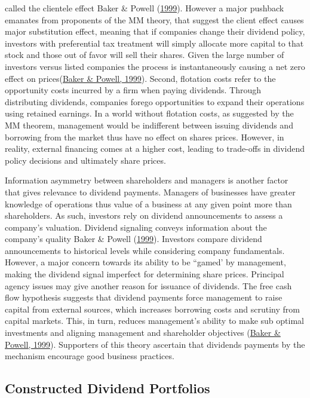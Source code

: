 \documentclass[10pt,preprint, authoryear]{elsarticle}
\numberwithin{equation}{section}
\numberwithin{figure}{section}
\numberwithin{table}{section}
\begin{document}
called the clientele effect Baker \& Powell
(\protect\hyperlink{ref-baker1999corporate}{1999}). However a major
pushback emanates from proponents of the MM theory, that suggest the
client effect causes major substitution effect, meaning that if
companies change their dividend policy, investors with preferential tax
treatment will simply allocate more capital to that stock and those out
of favor will sell their shares. Given the large number of investors
versus listed companies the process is instantaneously causing a net
zero effect on prices(\protect\hyperlink{ref-baker1999corporate}{Baker
\& Powell, 1999}). Second, flotation costs refer to the opportunity
costs incurred by a firm when paying dividends. Through distributing
dividends, companies forego opportunities to expand their operations
using retained earnings. In a world without flotation costs, as
suggested by the MM theorem, management would be indifferent between
issuing dividends and borrowing from the market thus have no effect on
shares prices. However, in reality, external financing comes at a higher
cost, leading to trade-offs in dividend policy decisions and ultimately
share prices.

Information asymmetry between shareholders and managers is another
factor that gives relevance to dividend payments. Managers of businesses
have greater knowledge of operations thus value of a business at any
given point more than shareholders. As such, investors rely on dividend
announcements to assess a company's valuation. Dividend signaling
conveys information about the company's quality Baker \& Powell
(\protect\hyperlink{ref-baker1999corporate}{1999}). Investors compare
dividend announcements to historical levels while considering company
fundamentals. However, a major concern towards its ability to be
``gamed' by management, making the dividend signal imperfect for
determining share prices. Principal agency issues may give another
reason for issuance of dividends. The free cash flow hypothesis suggests
that dividend payments force management to raise capital from external
sources, which increases borrowing costs and scrutiny from capital
markets. This, in turn, reduces management's ability to make sub optimal
investments and aligning management and shareholder objectives
(\protect\hyperlink{ref-baker1999corporate}{Baker \& Powell, 1999}).
Supporters of this theory ascertain that dividends payments by the
mechanism encourage good business practices.

\hypertarget{constructed-dividend-portfolios}{%
\subsection*{Constructed Dividend
Portfolios}\label{constructed-dividend-portfolios}}
\end{document}
